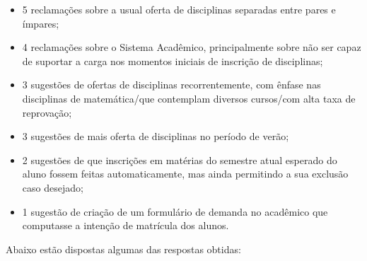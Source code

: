 \begin{itemize}
  \item 5 reclamações sobre a usual oferta de disciplinas separadas entre pares e ímpares;
  \item 4 reclamações sobre o Sistema Acadêmico, principalmente sobre não ser capaz de suportar a carga nos momentos iniciais de inscrição de disciplinas;
  \item 3 sugestões de ofertas de disciplinas recorrentemente, com ênfase nas disciplinas de matemática/que contemplam diversos cursos/com alta taxa de reprovação;
  \item 3 sugestões de mais oferta de disciplinas no período de verão;
  \item 2 sugestões de que inscrições em matérias do semestre atual esperado do aluno fossem feitas automaticamente, mas ainda permitindo a sua exclusão caso desejado;
  \item 1 sugestão de criação de um formulário de demanda no acadêmico que computasse a intenção de matrícula dos alunos.
\end{itemize}

Abaixo estão dispostas algumas das respostas obtidas:

